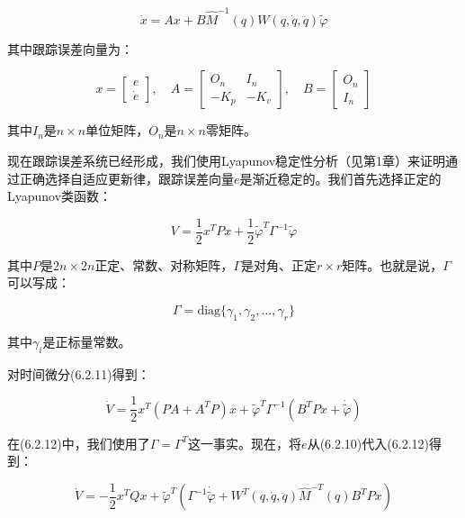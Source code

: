 \documentclass[12pt,a4paper]{ctexart}
\begin{document}
\begin{equation}\label{eq:state-space}
\dot{x} = Ax + B \hat{M}^{-1}(q) W(q, \dot{q}, \ddot{q}) \tilde{\varphi}
\end{equation}

其中跟踪误差向量为：

\begin{equation}
x = \begin{bmatrix} e \\ \dot{e} \end{bmatrix}, \quad A = \begin{bmatrix} O_n & I_n \\ -K_p & -K_v \end{bmatrix}, \quad B = \begin{bmatrix} O_n \\ I_n \end{bmatrix}
\end{equation}

其中$I_n$是$n \times n$单位矩阵，$O_n$是$n \times n$零矩阵。

现在跟踪误差系统已经形成，我们使用Lyapunov稳定性分析（见第1章）来证明通过正确选择自适应更新律，跟踪误差向量$e$是渐近稳定的。我们首先选择正定的Lyapunov类函数：

\begin{equation}\label{eq:lyapunov}
V = \frac{1}{2} x^T P x + \frac{1}{2} \tilde{\varphi}^T \Gamma^{-1} \tilde{\varphi}
\end{equation}

其中$P$是$2n \times 2n$正定、常数、对称矩阵，$\Gamma$是对角、正定$r \times r$矩阵。也就是说，$\Gamma$可以写成：

\begin{equation}
\Gamma = \text{diag}\{\gamma_1, \gamma_2, \ldots, \gamma_r\}
\end{equation}

其中$\gamma_i$是正标量常数。

对时间微分(6.2.11)得到：

\begin{equation}\label{eq:lyapunov-deriv}
\dot{V} = \frac{1}{2} x^T (PA + A^T P)x + \tilde{\varphi}^T \Gamma^{-1} \left( B^T P x + \dot{\tilde{\varphi}} \right)
\end{equation}

在(6.2.12)中，我们使用了$\Gamma = \Gamma^T$这一事实。现在，将$e$从(6.2.10)代入(6.2.12)得到：

\begin{equation}\label{eq:lyapunov-subst}
\dot{V} = -\frac{1}{2} x^T Q x + \tilde{\varphi}^T \left( \Gamma^{-1} \dot{\tilde{\varphi}} + W^T(q, \dot{q}, \ddot{q}) \hat{M}^{-T}(q) B^T P x \right)
\end{equation}
\end{document}
